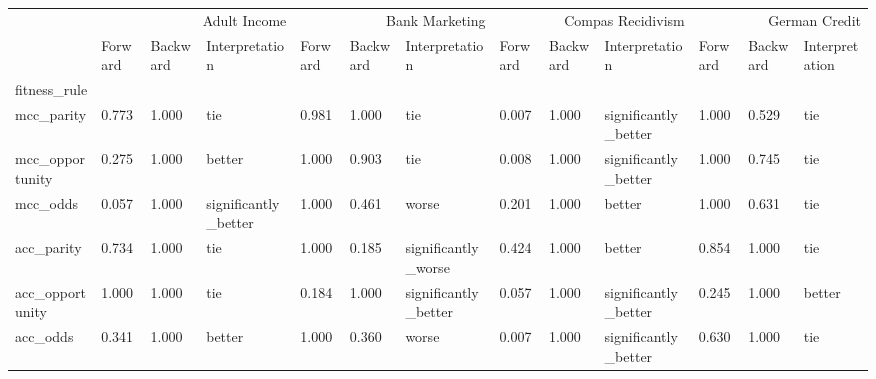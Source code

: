 \begin{tabular}{lllllllllllll}
\toprule
 & \multicolumn{3}{r}{Adult Income} & \multicolumn{3}{r}{Bank Marketing} & \multicolumn{3}{r}{Compas Recidivism} & \multicolumn{3}{r}{German Credit} \\
 & Forward & Backward & Interpretation & Forward & Backward & Interpretation & Forward & Backward & Interpretation & Forward & Backward & Interpretation \\
fitness_rule &  &  &  &  &  &  &  &  &  &  &  &  \\
\midrule
mcc_parity & 0.773 & 1.000 & tie & 0.981 & 1.000 & tie & 0.007 & 1.000 & significantly_better & 1.000 & 0.529 & tie \\
mcc_opportunity & 0.275 & 1.000 & better & 1.000 & 0.903 & tie & 0.008 & 1.000 & significantly_better & 1.000 & 0.745 & tie \\
mcc_odds & 0.057 & 1.000 & significantly_better & 1.000 & 0.461 & worse & 0.201 & 1.000 & better & 1.000 & 0.631 & tie \\
acc_parity & 0.734 & 1.000 & tie & 1.000 & 0.185 & significantly_worse & 0.424 & 1.000 & better & 0.854 & 1.000 & tie \\
acc_opportunity & 1.000 & 1.000 & tie & 0.184 & 1.000 & significantly_better & 0.057 & 1.000 & significantly_better & 0.245 & 1.000 & better \\
acc_odds & 0.341 & 1.000 & better & 1.000 & 0.360 & worse & 0.007 & 1.000 & significantly_better & 0.630 & 1.000 & tie \\
\bottomrule
\end{tabular}

